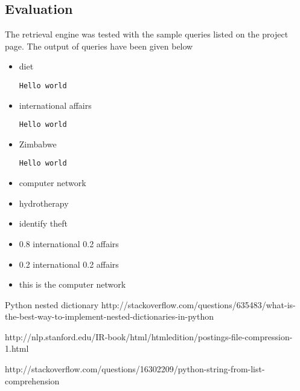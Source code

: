 \documentclass[paper=a4, fontsize=11pt]{scrartcl}
\numberwithin{equation}{section}		%
\numberwithin{figure}{section}			%
\numberwithin{table}{section}				%
\begin{document}
\subsection{Evaluation}

The retrieval engine was tested with the sample queries listed on the project page. The output of queries have been given below

\begin{itemize}

\item diet \\ 

\begin{verbatim}
Hello world
\end{verbatim}

\item international affairs

\begin{verbatim}
Hello world
\end{verbatim}

\item Zimbabwe

\begin{verbatim}
Hello world
\end{verbatim}

\item computer network

\item hydrotherapy

\item identify theft

\item 0.8 international 0.2 affairs

\item 0.2 international 0.2 affairs

\item this is the computer network

\end{itemize}


\clearpage

\begin{thebibliography}{1}

Python nested dictionary http://stackoverflow.com/questions/635483/what-is-the-best-way-to-implement-nested-dictionaries-in-python

 http://nlp.stanford.edu/IR-book/html/htmledition/postings-file-compression-1.html

 http://stackoverflow.com/questions/16302209/python-string-from-list-comprehension


  \end{thebibliography}

\end{document}
